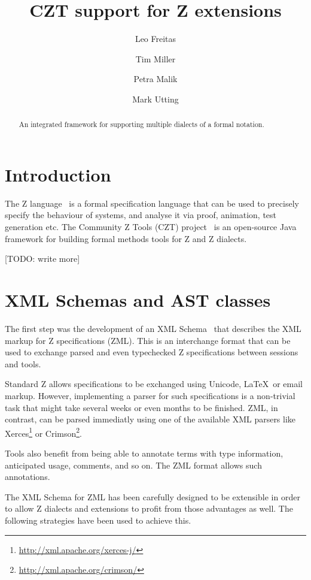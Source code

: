 \documentclass{llncs}
\begin{document}
\title{CZT support for Z extensions}
\author{Leo Freitas \and Tim Miller \and Petra Malik \and Mark Utting}
\maketitle

\begin{abstract}
  An integrated framework for supporting multiple dialects of a formal
  notation.
\end{abstract}

\section{Introduction} \label{sec:intro}

  The Z language~\cite{isoz} is a formal specification language that
  can be used to precisely specify the behaviour of systems, and
  analyse it via proof, animation, test generation etc.  The Community
  Z Tools (CZT) project~\cite{czt} is an open-source Java framework
  for building formal methods tools for Z and Z dialects.

  [TODO: write more]

\section{XML Schemas and AST classes}

  The first step was the development of an XML Schema~\cite{UttEA:03}
  that describes the XML markup for Z specifications (ZML).  This is
  an interchange format that can be used to exchange parsed and even
  typechecked Z specifications between sessions and tools.

  Standard Z allows specifications to be exchanged using Unicode,
  \LaTeX\ or email markup.  However, implementing a parser for such
  specifications is a non-trivial task that might take several weeks
  or even months to be finished.  ZML, in contrast, can be parsed
  immediatly using one of the available XML parsers like
  Xerces\footnote{\url{http://xml.apache.org/xerces-j/}} or
  Crimson\footnote{\url{http://xml.apache.org/crimson/}}.

  Tools also benefit from being able to annotate terms with type
  information, anticipated usage, comments, and so on.  The ZML format
  allows such annotations.

  The XML Schema for ZML has been carefully designed to be extensible
  in order to allow Z dialects and extensions to profit from those
  advantages as well.  The following strategies have been used to
  achieve this.
\end{document}
